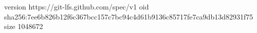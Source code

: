 version https://git-lfs.github.com/spec/v1
oid sha256:7ee6b826b12f6c367bcc157c7bc94c4d61b9136c85717fe7ca9db13d82931f75
size 1048672
